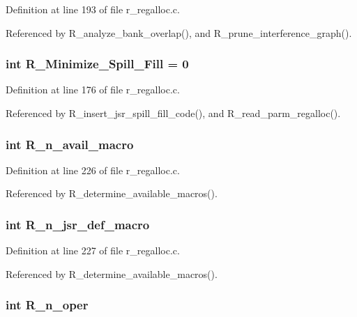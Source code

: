 Definition at line 193 of file r\_\-regalloc.c.

Referenced by R\_\-analyze\_\-bank\_\-overlap(), and R\_\-prune\_\-interference\_\-graph().
\subsubsection{\setlength{\rightskip}{0pt plus 5cm}int \bf{R\_\-Minimize\_\-Spill\_\-Fill} = 0}\label{r__regalloc_8c_4458f3f27c27bed0125cfce6a72e9839}




Definition at line 176 of file r\_\-regalloc.c.

Referenced by R\_\-insert\_\-jsr\_\-spill\_\-fill\_\-code(), and R\_\-read\_\-parm\_\-regalloc().
\subsubsection{\setlength{\rightskip}{0pt plus 5cm}int \bf{R\_\-n\_\-avail\_\-macro}}\label{r__regalloc_8c_214508ad8172ac6738e54d61bc4e4869}




Definition at line 226 of file r\_\-regalloc.c.

Referenced by R\_\-determine\_\-available\_\-macros().
\subsubsection{\setlength{\rightskip}{0pt plus 5cm}int \bf{R\_\-n\_\-jsr\_\-def\_\-macro}}\label{r__regalloc_8c_e85156301a9d5d6aa120ee2af71d6855}




Definition at line 227 of file r\_\-regalloc.c.

Referenced by R\_\-determine\_\-available\_\-macros().
\subsubsection{\setlength{\rightskip}{0pt plus 5cm}int \bf{R\_\-n\_\-oper}}\label{r__regalloc_8c_86fc593893c798d2cc9a1f08f6c221bf}




